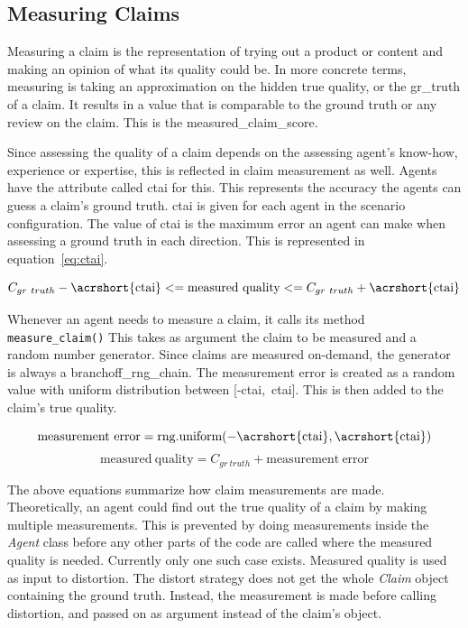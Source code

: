 \documentclass[%
    ]{\PathToTumTemplate/thesis/tum_thesis}
\begin{document}
\subsection{Measuring Claims}
Measuring a claim is the representation of trying out a product or content and making an opinion of what its quality could be.
In more concrete terms, measuring is taking an approximation on the hidden true quality, or the \gls{gr_truth} of a claim.
It results in a value that is comparable to the ground truth or any review on the claim.
This is the \gls{measured_claim_score}.

Since assessing the quality of a claim depends on the assessing agent's know-how, experience or expertise, this is reflected in claim measurement as well.
Agents have the attribute called \gls{ctai} for this.
This represents the accuracy the agents can guess a claim's ground truth.
\Gls{ctai} is given for each agent in the scenario configuration.
The value of \gls{ctai} is the maximum error an agent can make when assessing a ground truth in each direction.
This is represented in equation~\ref{eq:ctai}.

\begin{equation}\label{eq:ctai}
C_{gr~truth} - \mathrm{\acrshort{ctai}} <= \mathrm{measured~quality} <= C_{gr~truth} + \mathrm{\acrshort{ctai}}
\end{equation}

Whenever an agent needs to measure a claim, it calls its method \lstinline{measure_claim()}
This takes as argument the claim to be measured and a random number generator.
Since claims are measured on-demand, the generator is always a \gls{branchoff_rng_chain}.
The measurement error is created as a random value with uniform distribution between [-\acrshort{ctai},~\acrshort{ctai}].
This is then added to the claim's true quality.

\begin{equation}\label{eq:measure_claim1}
\mathrm{measurement~error = rng.uniform(-\acrshort{ctai}, \acrshort{ctai})}
\end{equation}
\begin{equation}\label{eq:measure_claim2}
\mathrm{measured~quality} = C_{gr~truth} + \mathrm{measurement~error}
\end{equation}

The above equations summarize how claim measurements are made.
Theoretically, an agent could find out the true quality of a claim by making multiple measurements.
This is prevented by doing measurements inside the \emph{Agent} class before any other parts of the code are called where the measured quality is needed.
Currently only one such case exists.
Measured quality is used as input to distortion.
The distort strategy does not get the whole \emph{Claim} object containing the ground truth.
Instead, the measurement is made before calling distortion, and passed on as argument instead of the claim's object.
\end{document}
